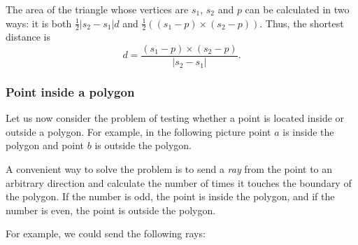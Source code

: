 The area of the triangle whose vertices are
$s_1$, $s_2$ and $p$ can be calculated in two ways:
it is both
$\frac{1}{2} |s_2-s_1| d$ and
$\frac{1}{2} ((s_1-p) \times (s_2-p))$.
Thus, the shortest distance is
\[ d = \frac{(s_1-p) \times (s_2-p)}{|s_2-s_1|} .\]

\subsubsection{Point inside a polygon}

Let us now consider the problem of
testing whether a point is located inside or outside
a polygon.
For example, in the following picture point $a$
is inside the polygon and point $b$ is outside
the polygon.

\begin{center}
\end{center}

A convenient way to solve the problem is to
send a \emph{ray} from the point to an arbitrary direction
and calculate the number of times it touches
the boundary of the polygon.
If the number is odd,
the point is inside the polygon,
and if the number is even,
the point is outside the polygon.

\begin{samepage}
    For example, we could send the following rays:
    \begin{center}
    \end{center}
\end{samepage}


